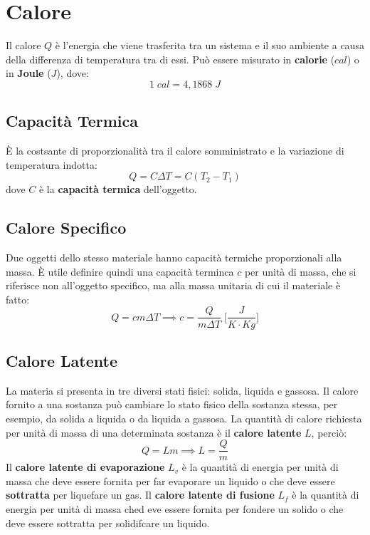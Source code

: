     \section{Calore} Il calore $Q$ è l'energia che viene trasferita tra un 
    sistema e il suo ambiente a causa della differenza di temperatura tra di 
    essi. Può essere misurato in \textbf{calorie} ($cal$) o in \textbf{Joule}
    ($J$), dove:
        \begin{equation*}
            1 \; cal = 4,1868 \; J
        \end{equation*}

        \subsection{Capacità Termica} È la costsante di proporzionalità tra il 
        calore somministrato e la variazione di temperatura indotta:
            \begin{equation}
                Q = C \Delta T = C (T_2 - T_1)
            \end{equation}
        dove $C$ è la \textbf{capacità termica} dell'oggetto.

        \subsection{Calore Specifico} Due oggetti dello stesso materiale hanno 
        capacità termiche proporzionali alla massa. È utile definire quindi una 
        capacità terminca $c$ per unità di massa, che si riferisce non 
        all'oggetto specifico, ma alla massa unitaria di cui il materiale è 
        fatto:
            \begin{equation}
                Q = cm \Delta T
                \implies
                c = \frac{Q}{m \Delta T}
             \; \Bigg[\frac{J}{K \cdot Kg}\Bigg]
            \end{equation}

        \subsection{Calore Latente} La materia si presenta in tre diversi stati
        fisici: solida, liquida e gassosa. Il calore fornito a una sostanza può
        cambiare lo stato fisico della sostanza stessa, per esempio, da solida 
        a liquida o da liquida a gassosa. La quantità di calore richiesta per 
        unità di massa di una determinata sostanza è il \textbf{calore 
        latente} $L$, perciò:
            \begin{equation}
                Q = Lm \implies L = \frac{Q}{m}
            \end{equation}
        Il \textbf{calore latente di evaporazione} $L_v$ è la quantità di 
        energia per unità di massa che deve essere fornita per far evaporare un
        liquido o che deve essere \textbf{sottratta} per liquefare un gas. Il 
        \textbf{calore latente di fusione} $L_f$ è la quantità di energia per 
        unità di massa ched eve essere fornita per fondere un solido o che deve
        essere sottratta per solidifcare un liquido.
        
